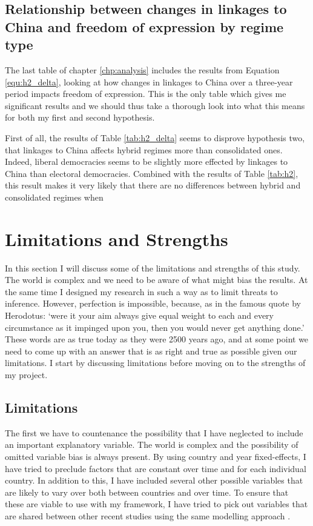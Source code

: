 \subsection{Relationship between changes in linkages to China and freedom of expression by regime type}
The last table of chapter \ref{chp:analysis} includes the results from Equation \ref{equ:h2_delta}, looking at how changes in linkages to China over a three-year period impacts freedom of expression. This is the only table which gives me significant results and we should thus take a thorough look into what this means for both my first and second hypothesis.

First of all, the results of Table \ref{tab:h2_delta} seems to disprove hypothesis two, that linkages to China affects hybrid regimes more than consolidated ones. Indeed, liberal democracies seems to be slightly more effected by linkages to China than electoral democracies. Combined with the results of Table \ref{tab:h2}, this result  makes it very likely that there are no differences between hybrid and consolidated regimes when 

\section{Limitations and Strengths}
In this section I will discuss some of the limitations and strengths of this study. The world is complex and we need to be aware of what might bias the results. At the same time I designed my research in such a way as to limit threats to inference. However, perfection is impossible, because, as in the famous quote by Herodotus: `were it your aim always give equal weight to each and every circumstance as it impinged upon you, then you would never get anything done.' These words are as true today as they were 2500 years ago, and at some point we need to come up with an answer that is as right and true as possible given our limitations. I start by discussing limitations before moving on to the strengths of my project.

\subsection{Limitations}
The first we have to countenance the possibility that I have neglected to include an important explanatory variable. The world is complex and the possibility of omitted variable bias is always present. By using country and year fixed-effects, I have tried to preclude factors that are constant over time and for each individual country. In addition to this, I have included several other possible variables that are likely to vary over both between countries and over time. To ensure that these are viable to use with my framework, I have tried to pick out variables that are shared between other recent studies using the same modelling approach \citep{gamso_is_2021, toettoe_foreign_2023}.

